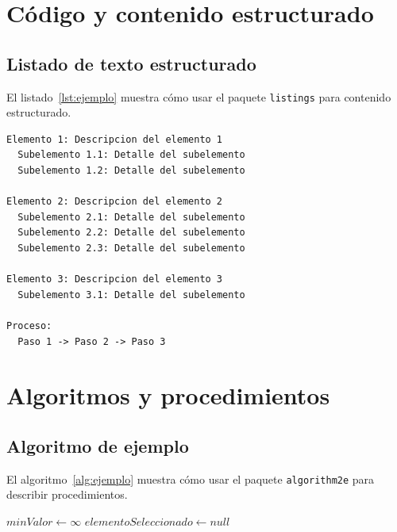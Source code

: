 \section{Código y contenido estructurado}

\subsection{Listado de texto estructurado}
El listado~\ref{lst:ejemplo} muestra cómo usar el paquete \texttt{listings} para contenido estructurado.
\begin{lstlisting}[caption={Ejemplo de contenido estructurado}, label=lst:ejemplo]
Elemento 1: Descripcion del elemento 1
  Subelemento 1.1: Detalle del subelemento
  Subelemento 1.2: Detalle del subelemento
    
Elemento 2: Descripcion del elemento 2
  Subelemento 2.1: Detalle del subelemento
  Subelemento 2.2: Detalle del subelemento
  Subelemento 2.3: Detalle del subelemento
    
Elemento 3: Descripcion del elemento 3
  Subelemento 3.1: Detalle del subelemento
    
Proceso:
  Paso 1 -> Paso 2 -> Paso 3
\end{lstlisting}

\section{Algoritmos y procedimientos}

\subsection{Algoritmo de ejemplo}
El algoritmo~\ref{alg:ejemplo} muestra cómo usar el paquete \texttt{algorithm2e} para describir procedimientos.
\begin{algorithm}[htbp]
  \caption{Ejemplo de procedimiento genérico}
  \label{alg:ejemplo}
  
  \BlankLine
  $minValor \gets \infty$\;
  $elementoSeleccionado \gets null$\;
  
  \BlankLine
  
  \BlankLine
\end{algorithm}

